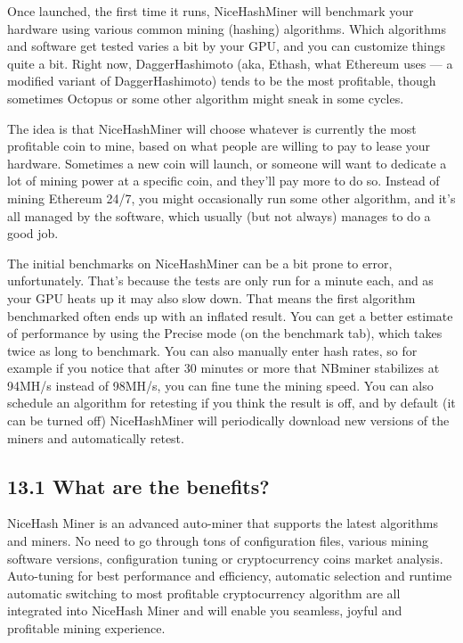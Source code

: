 Once launched, the first time it runs, NiceHashMiner will benchmark your hardware using various common mining (hashing) algorithms. Which algorithms and software get tested varies a bit by your GPU, and you can customize things quite a bit. Right now, DaggerHashimoto (aka, Ethash, what Ethereum uses — a modified variant of DaggerHashimoto) tends to be the most profitable, though sometimes Octopus or some other algorithm might sneak in some cycles.\vspace{.3cm}

The idea is that NiceHashMiner will choose whatever is currently the most profitable coin to mine, based on what people are willing to pay to lease your hardware. Sometimes a new coin will launch, or someone will want to dedicate a lot of mining power at a specific coin, and they'll pay more to do so. Instead of mining Ethereum 24/7, you might occasionally run some other algorithm, and it's all managed by the software, which usually (but not always) manages to do a good job.\vspace{.3cm}

The initial benchmarks on NiceHashMiner can be a bit prone to error, unfortunately. That's because the tests are only run for a minute each, and as your GPU heats up it may also slow down. That means the first algorithm benchmarked often ends up with an inflated result. You can get a better estimate of performance by using the Precise mode (on the benchmark tab), which takes twice as long to benchmark. You can also manually enter hash rates, so for example if you notice that after 30 minutes or more that NBminer stabilizes at 94MH/s instead of 98MH/s, you can fine tune the mining speed. You can also schedule an algorithm for retesting if you think the result is off, and by default (it can be turned off) NiceHashMiner will periodically download new versions of the miners and automatically retest.\vspace{.3cm}

\subsection*{13.1 What are the benefits?}

NiceHash Miner is an advanced auto-miner that supports the latest algorithms and miners. No need to go through tons of configuration files, various mining software versions, configuration tuning or cryptocurrency coins market analysis. Auto-tuning for best performance and efficiency, automatic selection and runtime automatic switching to most profitable cryptocurrency algorithm are all integrated into NiceHash Miner and will enable you seamless, joyful and profitable mining experience.\vspace{.3cm}


